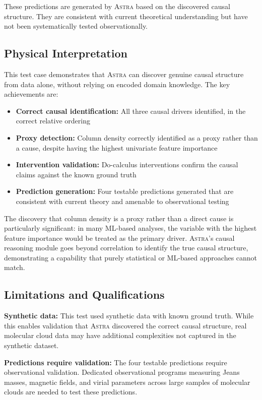 \documentclass[usenatbib]{rasti}
\newcommand{\astra}{\textsc{Astra}\xspace}
\begin{document}
These predictions are generated by \astra based on the discovered causal structure. They are consistent with current theoretical understanding but have not been systematically tested observationally.

\subsection{Physical Interpretation}
\label{sec:tc6:interpretation}

This test case demonstrates that \astra can discover genuine causal structure from data alone, without relying on encoded domain knowledge.
The key achievements are:
\begin{itemize}
  \item \textbf{Correct causal identification:} All three causal drivers identified, in the correct relative ordering
  \item \textbf{Proxy detection:} Column density correctly identified as a proxy rather than a cause, despite having the highest univariate feature importance
  \item \textbf{Intervention validation:} Do-calculus interventions confirm the causal claims against the known ground truth
  \item \textbf{Prediction generation:} Four testable predictions generated that are consistent with current theory and amenable to observational testing
\end{itemize}

The discovery that column density is a proxy rather than a direct cause is particularly significant: in many ML-based analyses, the variable with the highest feature importance would be treated as the primary driver.
\astra's causal reasoning module goes beyond correlation to identify the true causal structure, demonstrating a capability that purely statistical or ML-based approaches cannot match.

\subsection{Limitations and Qualifications}
\label{sec:tc6:limitations}

\textbf{Synthetic data:}
This test used synthetic data with known ground truth.
While this enables validation that \astra discovered the correct causal structure, real molecular cloud data may have additional complexities not captured in the synthetic dataset.

\textbf{Predictions require validation:}
The four testable predictions require observational validation.
Dedicated observational programs measuring Jeans masses, magnetic fields, and virial parameters across large samples of molecular clouds are needed to test these predictions.
\end{document}
